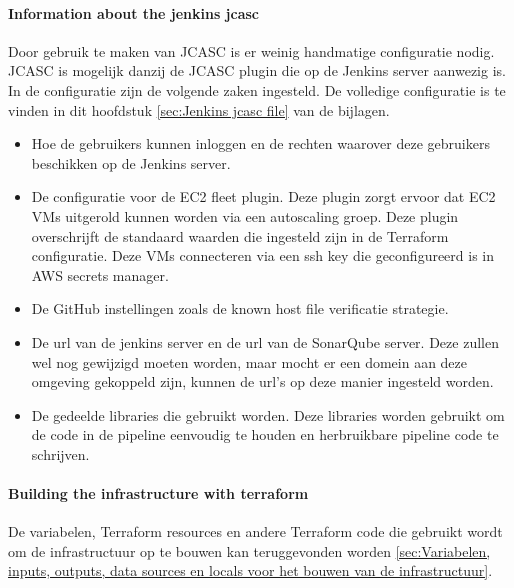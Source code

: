 \paragraph{
{Information about the jenkins jcasc}}
\label{sec:Uitleg over de jenkins jcasc}

Door gebruik te maken van JCASC is er weinig handmatige configuratie nodig. JCASC is mogelijk danzij de JCASC plugin die op de Jenkins server aanwezig is. In de configuratie zijn de volgende zaken ingesteld. De volledige configuratie is te vinden in dit hoofdstuk \ref{sec:Jenkins jcasc file} van de bijlagen.

\begin{itemize}
  \item Hoe de gebruikers kunnen inloggen en de rechten waarover deze gebruikers beschikken op de Jenkins server.
  \item De configuratie voor de EC2 fleet plugin. Deze plugin zorgt ervoor dat EC2 VMs uitgerold kunnen worden via een autoscaling groep. Deze plugin overschrijft de standaard waarden die ingesteld zijn in de Terraform configuratie. Deze VMs connecteren via een ssh key die geconfigureerd is in AWS secrets manager.
  \item De GitHub instellingen zoals de known host file verificatie strategie.
  \item De url van de jenkins server en de url van de SonarQube server. Deze zullen wel nog gewijzigd moeten worden, maar mocht er een domein aan deze omgeving gekoppeld zijn, kunnen de url's op deze manier ingesteld worden.
  \item De gedeelde libraries die gebruikt worden. Deze libraries worden gebruikt om de code in de pipeline eenvoudig te houden en herbruikbare pipeline code te schrijven.
\end{itemize}

\paragraph{
{Building the infrastructure with terraform}}
\label{sec:Bouwen van de infrastructuur met terraform}

De variabelen, Terraform resources en andere Terraform code die gebruikt wordt om de infrastructuur op te bouwen kan teruggevonden worden \ref{sec:Variabelen, inputs, outputs, data sources en locals voor het bouwen van de infrastructuur}.
\newline

